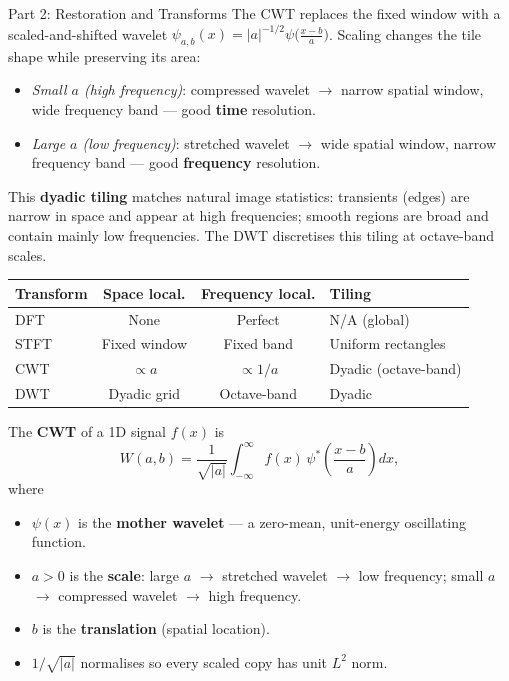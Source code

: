 \documentclass[letterpaper]{article}
\begin{document}
\begin{notes}{Part 2: Restoration and Transforms}
The CWT replaces the fixed window with a scaled-and-shifted wavelet $\psi_{a,b}(x)=|a|^{-1/2}\psi\!\bigl(\frac{x-b}{a}\bigr)$. Scaling changes the tile shape while preserving its area:
\begin{itemize}
    \item \emph{Small $a$ (high frequency)}: compressed wavelet $\to$ narrow spatial window, wide frequency band — good \textbf{time} resolution.
    \item \emph{Large $a$ (low frequency)}: stretched wavelet $\to$ wide spatial window, narrow frequency band — good \textbf{frequency} resolution.
\end{itemize}
This \textbf{dyadic tiling} matches natural image statistics: transients (edges) are narrow in space and appear at high frequencies; smooth regions are broad and contain mainly low frequencies. The DWT discretises this tiling at octave-band scales.

\begin{center}
\begin{tabular}{@{}lccl@{}}
\toprule
Transform & Space local. & Frequency local. & Tiling \\
\midrule
DFT  & None & Perfect & N/A (global) \\
STFT & Fixed window & Fixed band & Uniform rectangles \\
CWT  & $\propto a$ & $\propto 1/a$ & Dyadic (octave-band) \\
DWT  & Dyadic grid & Octave-band & Dyadic \\
\bottomrule
\end{tabular}
\end{center}


The \textbf{CWT} of a 1D signal $f(x)$ is
$$W(a, b) = \frac{1}{\sqrt{|a|}} \int_{-\infty}^{\infty} f(x)\, \psi^*\!\left(\frac{x-b}{a}\right) dx,$$
where
\begin{itemize}
    \item $\psi(x)$ is the \textbf{mother wavelet} --- a zero-mean, unit-energy oscillating function.
    \item $a > 0$ is the \textbf{scale}: large $a$ $\to$ stretched wavelet $\to$ low frequency; small $a$ $\to$ compressed wavelet $\to$ high frequency.
    \item $b$ is the \textbf{translation} (spatial location).
    \item $1/\sqrt{|a|}$ normalises so every scaled copy has unit $L^2$ norm.
\end{itemize}


\end{notes}
\end{document}
